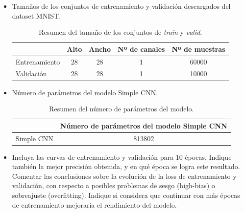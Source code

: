 \documentclass[12pt]{scrartcl}
\begin{document}
\begin{itemize}
    \item Tamaños de los conjuntos de entrenamiento y validación descargados del dataset MNIST.
    \begin{table}[H]
        \centering
        \begin{tabular}{l c c c c}
            \multicolumn{1}{c}{}                & \cellcolor[HTML]{E3E7EC}Alto & \cellcolor[HTML]{E3E7EC}Ancho & \cellcolor[HTML]{E3E7EC}Nº de canales & \cellcolor[HTML]{E3E7EC}Nº de muestras \\ \hline
            \cellcolor[HTML]{E3E7EC}Entrenamiento & 28                                        & 28                                         & 1                                               & 60000                                  \\
            \cellcolor[HTML]{E3E7EC}Validación    & 28                                        & 28                                         & 1                                               & 10000                                  \\ 
        \end{tabular}
        \caption{Resumen del tamaño de los conjuntos de \emph{train} y \emph{valid}.}
        \label{table:res1}
    \end{table}
    \item Número de parámetros del modelo Simple CNN.
    \begin{table}[H]
        \centering
        \begin{tabular}{l c}
            \multicolumn{1}{c}{}             & \cellcolor[HTML]{E3E7EC}Número de parámetros del modelo Simple CNN \\ \hline
            \cellcolor[HTML]{E3E7EC}Simple CNN & 813802                                                             \\
        \end{tabular}
        \caption{Resumen del número de parámetros del modelo.}
        \label{table:res1}
    \end{table}
    \item Incluya las curvas de entrenamiento y validación para 10 épocas. Indique también la mejor precisión obtenida, y en qué época se logra este resultado. Comentar las conclusiones sobre la evolución de la loss de entrenamiento y validación, con respecto a posibles problemas de sesgo (high-bias) o sobreajuste (overfitting). Indique si considera que continuar con más épocas de entrenamiento mejoraría el rendimiento del modelo.

\end{itemize}
\end{document}
